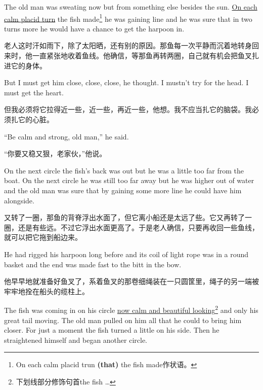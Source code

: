 \begin{paracol}{2}
\switchcolumn*

The old man was sweating now but from something else \gls{besides} the
sun. \uline{On each calm \gls{placid} turn} the fish made\footnote{On each calm
  placid trun \textbf{(that)} the fish made作状语。} he was gaining line and
he was sure that in two turns more he would have a chance to get the harpoon
in.

\switchcolumn

老人这时汗如雨下，除了太阳晒，还有别的原因。那鱼每一次平静而沉着地转身回来时，他一直紧张地收着鱼线。他确信，等那鱼再转两圈，自己就有机会把鱼叉扎进它的身体。

\switchcolumn*

But I must get him close, close, close, he thought. I mustn't try for the
head. I must get the heart.

\switchcolumn

但我必须将它拉得近一些，近一些，再近一些，他想。我不应当扎它的脑袋。我必须扎它的心脏。

\switchcolumn*

``Be calm and strong, old man,'' he said.

\switchcolumn

“你要又稳又狠，老家伙，”他说。

\switchcolumn*

On the next circle the fish's back was out but he was a little too far from
the boat. On the next circle he was still too far away but he was higher out
of water and the old man was sure that by \gls{gaining} some more line he could
have him alongside.

\switchcolumn

又转了一圈，那鱼的背脊浮出水面了，但它离小船还是太远了些。它又再转了一圈，还是有些远。不过它浮出水面更高了。于是老人确信，只要再收回一些鱼线，就可以把它拖到船边来。

\switchcolumn*

He had rigged his harpoon long before and its coil of light rope was in a
round basket and the end was made fast to the bitt in the bow.

\switchcolumn

他早早地就准备好鱼叉了，系着鱼叉的那卷细绳装在一只圆筐里，绳子的另一端被牢牢地拴在船头的缆柱上。

\switchcolumn*

The fish was coming in on his circle \uline{now calm and beautiful
  looking}\footnote{下划线部分修饰句首the fish \ldots{}} and only his great tail
moving. The old man pulled on him all that he could to bring him closer. For
just a moment the fish turned a little on his side. Then he
\gls{straightened} himself and began another circle.


\end{paracol}
